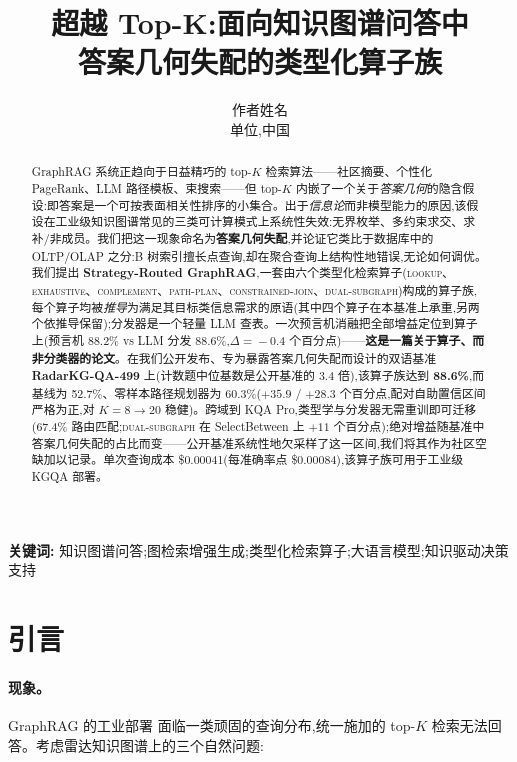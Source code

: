 \documentclass[11pt,a4paper]{article}
\title{\bfseries 超越 Top-K:面向知识图谱问答中\\答案几何失配的类型化算子族}
\author{作者姓名\\ \small 单位,中国}
\date{}
\newcommand{\op}[1]{\textsc{\small #1}}
\begin{document}
\maketitle

\begin{abstract}
\noindent
GraphRAG 系统正趋向于日益精巧的 top-$K$ 检索算法——社区摘要、个性化 PageRank、LLM 路径模板、束搜索——但 top-$K$ 内嵌了一个关于\emph{答案几何}的隐含假设:即答案是一个可按表面相关性排序的小集合。出于\emph{信息论}而非模型能力的原因,该假设在工业级知识图谱常见的三类可计算模式上系统性失效:无界枚举、多约束求交、求补/非成员。我们把这一现象命名为\textbf{答案几何失配},并论证它类比于数据库中的 OLTP/OLAP 之分:B 树索引擅长点查询,却在聚合查询上结构性地错误,无论如何调优。我们提出 \textbf{Strategy-Routed GraphRAG},一套由六个类型化检索算子(\op{lookup}、\op{exhaustive}、\op{complement}、\op{path-plan}、\op{constrained-join}、\op{dual-subgraph})构成的算子族,每个算子均被\emph{推导}为满足其目标类信息需求的原语(其中四个算子在本基准上承重,另两个依推导保留);分发器是一个轻量 LLM 查表。一次预言机消融把全部增益定位到算子上(预言机 88.2\% vs LLM 分发 88.6\%,$\Delta\!=\!-0.4$ 个百分点)——\textbf{这是一篇关于算子、而非分类器的论文}。在我们公开发布、专为暴露答案几何失配而设计的双语基准 \textbf{RadarKG-QA-499} 上(计数题中位基数是公开基准的 $3.4$ 倍),该算子族达到 \textbf{88.6\%},而基线为 52.7\%、零样本路径规划器为 60.3\%($+35.9$ / $+28.3$ 个百分点,配对自助置信区间严格为正,对 $K{=}8{\to}20$ 稳健)。跨域到 KQA Pro,类型学与分发器无需重训即可迁移(67.4\% 路由匹配;\op{dual-subgraph} 在 SelectBetween 上 $+11$ 个百分点);绝对增益随基准中答案几何失配的占比而变——公开基准系统性地欠采样了这一区间,我们将其作为社区空缺加以记录。单次查询成本 \$0.00041(每准确率点 \$0.00084),该算子族可用于工业级 KGQA 部署。
\end{abstract}

\noindent\textbf{关键词:} 知识图谱问答;图检索增强生成;类型化检索算子;大语言模型;知识驱动决策支持

\section{引言}
\label{sec:intro}

\paragraph{现象。}
GraphRAG 的工业部署 \citep{edge2024graphrag,gutierrez2024hipporag,luo2024rog,sun2024tog,ma2025tog2} 面临一类顽固的查询分布,统一施加的 top-$K$ 检索无法回答。考虑雷达知识图谱上的三个自然问题:
\end{document}
